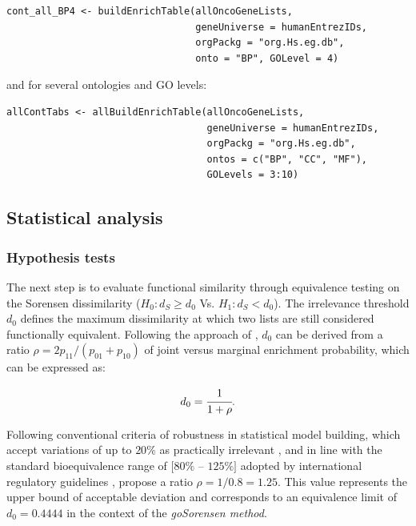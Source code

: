 \begin{verbatim}
cont_all_BP4 <- buildEnrichTable(allOncoGeneLists,
                                 geneUniverse = humanEntrezIDs, 
                                 orgPackg = "org.Hs.eg.db", 
                                 onto = "BP", GOLevel = 4)
\end{verbatim}

and for several ontologies and GO levels:

\begin{verbatim}
allContTabs <- allBuildEnrichTable(allOncoGeneLists,
                                   geneUniverse = humanEntrezIDs, 
                                   orgPackg = "org.Hs.eg.db", 
                                   ontos = c("BP", "CC", "MF"), 
                                   GOLevels = 3:10)
\end{verbatim}

\hypertarget{statistical-analysis}{%
\subsection{Statistical analysis}\label{statistical-analysis}}

\hypertarget{hypothesis-tests}{%
\subsubsection{Hypothesis tests}\label{hypothesis-tests}}

The next step is to evaluate functional similarity through equivalence testing on the Sorensen dissimilarity (\(H_0: d_S \geq d_0\) Vs. \(H_1: d_S < d_0\)). The irrelevance threshold \(d_0\) defines the maximum dissimilarity at which two lists are still considered functionally equivalent. Following the approach of \citet{flores2022equivalence}, \(d_0\) can be derived from a ratio \(\rho = 2p_{11}/(p_{01}+p_{10})\) of joint versus marginal enrichment probability, which can be expressed as:

\[
d_0 = \cfrac{1}{1+\rho}.
\]

Following conventional criteria of robustness in statistical model building, which accept variations of up to \(20\%\) as practically irrelevant \citep{box1979robustness}, and in line with the standard bioequivalence range of \([80\%\) \(–\) \(125\%]\) adopted by international regulatory guidelines \citep{food1992guidance, europeanguidance}, \citet{flores2022equivalence} propose a ratio \(\rho = 1/0.8=1.25\). This value represents the upper bound of acceptable deviation and corresponds to an equivalence limit of \(d_0=0.4444\) in the context of the \emph{goSorensen method}.

